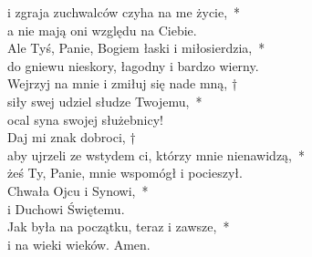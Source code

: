 \begin{tabbing}
\>i zgraja zuchwalców czyha na me życie,~*\\
\>a nie mają oni względu na Ciebie.\\
Ale Tyś, Panie, Bogiem łaski i miłosierdzia,~*\\
do gniewu nieskory, łagodny i bardzo wierny.\\
\>Wejrzyj na mnie i zmiłuj się nade mną, †\\
\>siły swej udziel słudze Twojemu,~*\\
\>ocal syna swojej służebnicy!\\
Daj mi znak dobroci, †\\
aby ujrzeli ze wstydem ci, którzy mnie nienawidzą,~*\\
żeś Ty, Panie, mnie wspomógł i pocieszył.\\
\>Chwała Ojcu i Synowi,~*\\
\>i Duchowi Świętemu.\\
Jak była na początku, teraz i zawsze,~*\\
i na wieki wieków. Amen.
\end{tabbing}